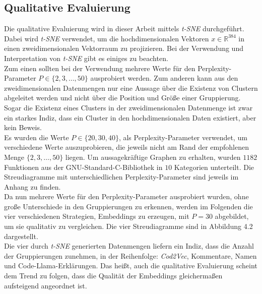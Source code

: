 \documentclass[12pt,letterpaper,ngerman]{article}
\begin{document}
\subsection{Qualitative Evaluierung} 
Die qualitative Evaluierung wird in dieser Arbeit mittels
\textit{t-SNE} durchgeführt. Dabei wird \textit{t-SNE} verwendet,
um die hochdimensionalen Vektoren $x \in \mathbb{R}^{384}$ in einen
zweidimensionalen Vektorraum zu projizieren. Bei der Verwendung und 
Interpretation von \textit{t-SNE} gibt es einiges zu beachten. \\
Zum einen sollten bei der Verwendung mehrere Werte für den
Perplexity-Parameter $P \in \{2,3,\dots ,50\}$ ausprobiert werden. 
Zum anderen kann aus den zweidimensionalen Datenmengen nur eine Aussage
über die Existenz von Clustern abgeleitet werden und nicht über die
Position und Größe einer Gruppierung. Sogar die Existenz eines Clusters 
in der zweidimensionalen Datenmenge ist zwar ein starkes Indiz,
dass ein Cluster in den hochdimensionalen Daten existiert, 
aber kein Beweis.\\
Es wurden die Werte $P \in \{20, 30, 40\}$, als Perplexity-Parameter 
verwendet, um verschiedene Werte auszuprobieren, die jeweils nicht 
am Rand der empfohlenen Menge $\{2,3, \dots, 50\}$ liegen.
Um aussagekräftige Graphen zu erhalten, wurden $1182$ Funktionen aus
der GNU-Standard-C-Bibliothek in $10$ Kategorien unterteilt. Die 
Streudiagramme mit unterschiedlichen Perplexity-Parameter sind 
jeweils im Anhang zu finden.\\
Da nun mehrere Werte für den Perplexity-Parameter ausprobiert wurden,
ohne große Unterschiede in den Gruppierungen zu erkennen, werden im 
Folgenden die vier verschiedenen Strategien, Embeddings zu erzeugen,
mit $P = 30$ abgebildet, um sie qualitativ zu vergleichen. Die 
vier Streudiagramme sind in Abbildung 4.2 dargestellt.\\
Die vier durch \textit{t-SNE} generierten Datenmengen liefern ein Indiz,
dass die Anzahl der Gruppierungen zunehmen, in der Reihenfolge: 
\textit{Cod2Vec}, Kommentare, Namen und Code-Llama-Erklärungen.
Das heißt, auch die qualitative Evaluierung scheint dem Trend zu 
folgen, dass die Qualität der Embeddings gleichermaßen aufsteigend
angeordnet ist.
%
\end{document}
